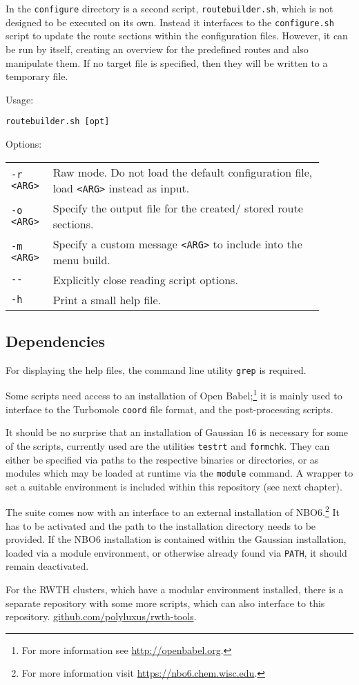 \documentclass[   %
  final,          %
  a4paper         %
]{article}
\begin{document}
In the \texttt{configure} directory is a second script, \lstinline`routebuilder.sh`,
which is not designed to be executed on its own.
Instead it interfaces to the \lstinline`configure.sh` script to update the route sections within the configuration files.
However, it can be run by itself, creating an overview for the predefined routes and also manipulate them.
If no target file is specified, then they will be written to a temporary file.

Usage: 

\lstinline`routebuilder.sh [opt]`

Options:

\begin{tabular}{p{0.1\linewidth}p{0.8\linewidth}}
  {\lstinline`-r <ARG>`} & Raw mode. 
    Do not load the default configuration file, load \lstinline`<ARG>` instead as input.\\
  {\lstinline`-o <ARG>`} & Specify the output file for the created/ stored route sections.\\
  {\lstinline`-m <ARG>`} & Specify a custom message \lstinline`<ARG>` to include into the menu build.\\
  {\lstinline`--`}       & Explicitly close reading script options. \\
  {\lstinline`-h`}       & Print a small help file. \\
\end{tabular}


\subsection{Dependencies}

For displaying the help files, the command line utility \texttt{grep} is required.

Some scripts need access to an installation of Open Babel;\footnote{%
  For more information see \href{http://openbabel.org}{http://openbabel.org}.}
it is mainly used to interface to the Turbomole \texttt{coord} file format,
and the post-processing scripts.

It should be no surprise that an installation of Gaussian 16 is necessary for
some of the scripts, currently used are the utilities \texttt{testrt} and \texttt{formchk}.
They can either be specified via paths to the respective binaries or directories,
or as modules which may be loaded at runtime via the \texttt{module} command.
A wrapper to set a suitable environment is included within this repository (see next chapter).

The suite comes now with an interface to an external installation of NBO6.\footnote{%
  For more information visit \href{https://nbo6.chem.wisc.edu}{https://nbo6.chem.wisc.edu}.}
It has to be activated and the path to the installation directory needs to be provided.
If the NBO6 installation is contained within the Gaussian installation,
loaded via a module environment, or otherwise already found via \texttt{PATH},
it should remain deactivated.

For the RWTH clusters, which have a modular environment installed, 
there is a separate repository with some more scripts, 
which can also interface to this repository.
\href{https://github.com/polyluxus/rwth-tools}{github.com/polyluxus/rwth-tools}.
\end{document}
